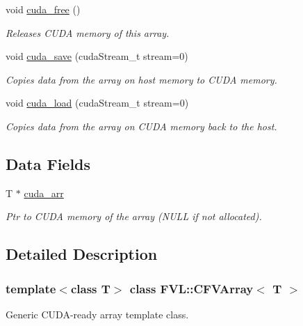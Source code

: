 \begin{DoxyCompactItemize}
void \hyperlink{classFVL_1_1CFVArray_a7da37a3af0dbb3b115a980bf13d30d02}{cuda\_\-free} ()
\begin{DoxyCompactList}\small\item\em Releases CUDA memory of this array. \item\end{DoxyCompactList}\item 
void \hyperlink{classFVL_1_1CFVArray_a817cca487c7f644b7e5d1abf8bd42308}{cuda\_\-save} (cudaStream\_\-t stream=0)
\begin{DoxyCompactList}\small\item\em Copies data from the array on host memory to CUDA memory. \item\end{DoxyCompactList}\item 
void \hyperlink{classFVL_1_1CFVArray_a9ea6b5a93cae1474a26ebef38d1eb350}{cuda\_\-load} (cudaStream\_\-t stream=0)
\begin{DoxyCompactList}\small\item\em Copies data from the array on CUDA memory back to the host. \item\end{DoxyCompactList}\end{DoxyCompactItemize}
\subsection*{Data Fields}
\begin{DoxyCompactItemize}
\item 
T $\ast$ \hyperlink{classFVL_1_1CFVArray_ac7c2eda2752dff79215dfcc062d0d814}{cuda\_\-arr}
\begin{DoxyCompactList}\small\item\em Ptr to CUDA memory of the array (NULL if not allocated). \item\end{DoxyCompactList}\end{DoxyCompactItemize}


\subsection{Detailed Description}
\subsubsection*{template$<$class T$>$ class FVL::CFVArray$<$ T $>$}

Generic CUDA-\/ready array template class. 

